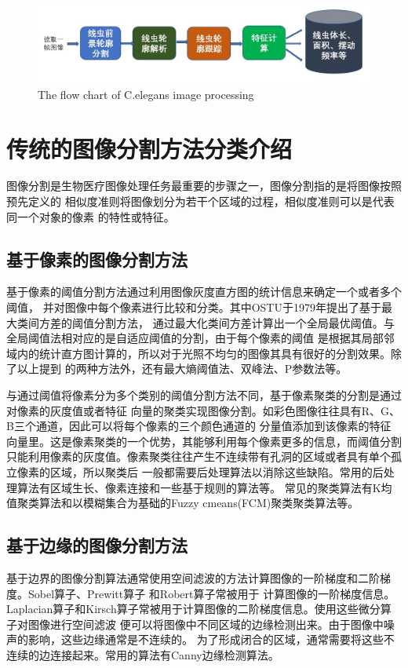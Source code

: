 	\begin{figure}[h]
	  \centering
	  \includegraphics[width=14cm]{figure/chap3/flow.jpg}
		{The flow chart of C.elegans image processing}
	  \label{fig:flow}
	\end{figure}
\section{传统的图像分割方法分类介绍}
	图像分割是生物医疗图像处理任务最重要的步骤之一，图像分割指的是将图像按照预先定义的
	相似度准则将图像划分为若干个区域的过程，相似度准则可以是代表同一个对象的像素
	的特性或特征。
\subsection{基于像素的图像分割方法}
	基于像素的阈值分割方法通过利用图像灰度直方图的统计信息来确定一个或者多个阈值，
	并对图像中每个像素进行比较和分类。其中OSTU于1979年提出了基于最大类间方差的阈值分割方法\cite{otsu1979threshold}，
	通过最大化类间方差计算出一个全局最优阈值。与全局阈值法相对应的是自适应阈值的分割，由于每个像素的阈值
	是根据其局部邻域内的统计直方图计算的，所以对于光照不均匀的图像其具有很好的分割效果。除了以上提到
	的两种方法外，还有最大熵阈值法、双峰法、P参数法等。
	
	与通过阈值将像素分为多个类别的阈值分割方法不同，基于像素聚类的分割是通过对像素的灰度值或者特征
	向量的聚类实现图像分割。如彩色图像往往具有R、G、B三个通道，因此可以将每个像素的三个颜色通道的
	分量值添加到该像素的特征向量里。这是像素聚类的一个优势，其能够利用每个像素更多的信息，而阈值分割
	只能利用像素的灰度值。像素聚类往往产生不连续带有孔洞的区域或者具有单个孤立像素的区域，所以聚类后
	一般都需要后处理算法以消除这些缺陷。常用的后处理算法有区域生长、像素连接和一些基于规则的算法等。
	常见的聚类算法有K均值聚类算法\cite{forgy1965cluster}和以模糊集合为基础的Fuzzy cmeans(FCM)聚类聚类算法\cite{evers1999fuzzy}等。
\subsection{基于边缘的图像分割方法}
	基于边界的图像分割算法通常使用空间滤波的方法计算图像的一阶梯度和二阶梯度。Sobel算子、Prewitt算子
	和Robert算子常被用于
	计算图像的一阶梯度信息。Laplacian算子和Kirsch算子常被用于计算图像的二阶梯度信息。使用这些微分算子对图像进行空间滤波
	便可以将图像中不同区域的边缘检测出来。由于图像中噪声的影响，这些边缘通常是不连续的。
	为了形成闭合的区域，通常需要将这些不连续的边连接起来。常用的算法有Canny边缘检测算法。
